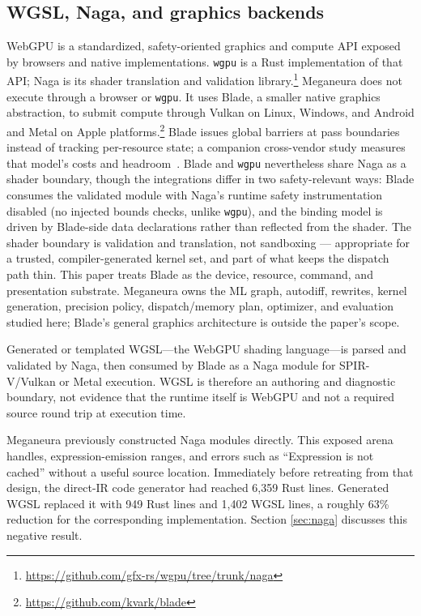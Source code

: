 \documentclass[10pt,twocolumn]{article}
\newcommand{\system}{Meganeura}
\newcommand{\code}[1]{\texttt{#1}}
\begin{document}
\subsection{WGSL, Naga, and graphics backends}

WebGPU is a standardized, safety-oriented graphics and compute API exposed by
browsers and native implementations. \code{wgpu} is a Rust implementation of
that API; Naga is its shader translation and validation library.\footnote{
\url{https://github.com/gfx-rs/wgpu/tree/trunk/naga}}
\system{} does not execute through a browser or \code{wgpu}. It uses Blade, a
smaller native graphics abstraction, to submit compute through Vulkan on
Linux, Windows, and Android and Metal on Apple platforms.\footnote{
\url{https://github.com/kvark/blade}}
Blade issues global barriers at pass boundaries instead of tracking
per-resource state; a companion cross-vendor study measures that model's
costs and headroom~\cite{malyshau2026barriers}.
Blade and \code{wgpu} nevertheless share Naga as a shader boundary, though
the integrations differ in two safety-relevant ways: Blade consumes the
validated module with Naga's runtime safety instrumentation disabled (no
injected bounds checks, unlike \code{wgpu}), and the binding model is
driven by Blade-side data declarations rather than reflected from the
shader. The shader boundary is validation and translation, not sandboxing
--- appropriate for a trusted, compiler-generated kernel set, and part of
what keeps the dispatch path thin.
This paper treats Blade as the device, resource, command, and presentation
substrate. \system{} owns the ML graph, autodiff, rewrites, kernel generation,
precision policy, dispatch/memory plan, optimizer, and evaluation studied
here; Blade's general graphics architecture is outside the paper's scope.

Generated or templated WGSL---the WebGPU shading language---is parsed and
validated by Naga, then consumed by Blade as a Naga module for SPIR-V/Vulkan
or Metal execution. WGSL is therefore an authoring and diagnostic boundary,
not evidence that the runtime itself is WebGPU and not a required source
round trip at execution time.

\system{} previously constructed Naga modules directly. This exposed arena
handles, expression-emission ranges, and errors such as ``Expression is not
cached'' without a useful source location. Immediately before retreating from
that design, the direct-IR code generator had reached 6,359 Rust lines.
Generated WGSL replaced it with 949 Rust lines and 1,402 WGSL lines, a roughly
63\% reduction for the corresponding implementation. Section
\ref{sec:naga} discusses this negative result.
\end{document}
